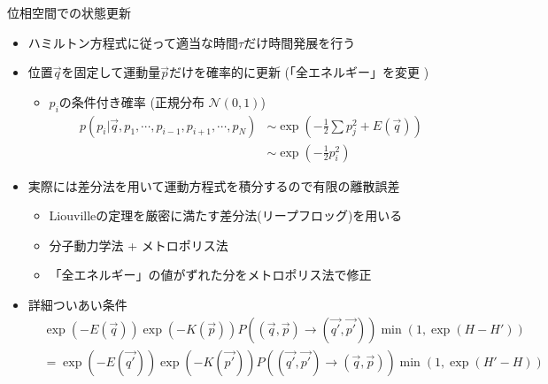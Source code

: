 
\begin{frame}[t,fragile]{位相空間での状態更新}
  \begin{itemize}
  \item ハミルトン方程式に従って適当な時間\(\tau\)だけ時間発展を行う
  \item 位置\(\vec{q}\)を固定して運動量\(\vec{p}\)だけを確率的に更新 (「全エネルギー」を変更 )
  \begin{itemize}
    \item \(p_i\)の条件付き確率 (正規分布 \(\mathcal{N}(0,1)\))
    \begin{align*}
      p(p_i|\vec{q},p_1,\cdots,p_{i-1},p_{i+1},\cdots,p_N) &\sim \exp (-\frac{1}{2}\sum p_j^2+E(\vec{q})) \\ &\sim \exp(-\frac{1}{2}p_i^2)
    \end{align*}
  \end{itemize}

  \item 実際には差分法を用いて運動方程式を積分するので有限の離散誤差
  \begin{itemize}
    \item Liouvilleの定理を厳密に満たす差分法(リープフロッグ)を用いる
    \item 分子動力学法 + メトロポリス法
    \item 「全エネルギー」の値がずれた分をメトロポリス法で修正
  \end{itemize}

  \item 詳細ついあい条件
  \begin{align*}
    &\exp(-E(\vec{q})) \exp(-K(\vec{p})) P((\vec{q},\vec{p})\rightarrow(\vec{q'},\vec{p'})) \min (1, \exp(H-H')) \\
    & = \exp(-E(\vec{q'})) \exp(-K(\vec{p'})) P((\vec{q'},\vec{p'})\rightarrow(\vec{q},\vec{p})) \min (1, \exp(H'-H))
  \end{align*}
\end{itemize}
\end{frame}
